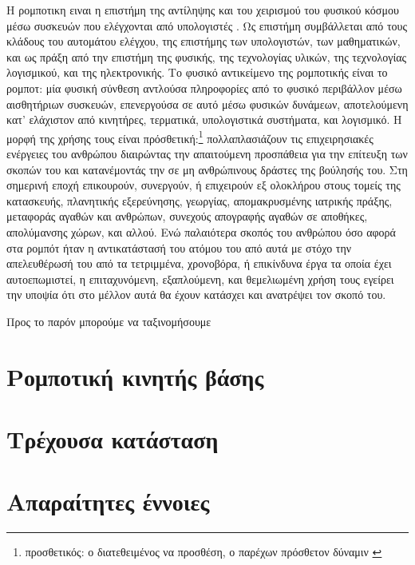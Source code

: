 Η ρομποτικη ειναι η επιστήμη της αντίληψης και του χειρισμού του φυσικού κόσμου
μέσω συσκευών που ελέγχονται από υπολογιστές \cite{thrun2005probabilistic}.  Ως
επιστήμη συμβάλλεται από τους κλάδους του αυτομάτου ελέγχου, της επιστήμης των
υπολογιστών, των μαθηματικών, και ως πράξη από την επιστήμη της φυσικής, της
τεχνολογίας υλικών, της τεχνολογίας λογισμικού, και της ηλεκτρονικής. Το φυσικό
αντικείμενο της ρομποτικής είναι το ρομποτ: μία φυσική σύνθεση αντλούσα
πληροφορίες από το φυσικό περιβάλλον μέσω αισθητήριων συσκευών, επενεργούσα σε
αυτό μέσω φυσικών δυνάμεων, αποτελούμενη κατ' ελάχιστον από κινητήρες,
τερματικά, υπολογιστικά συστήματα, και λογισμικό. Η μορφή της χρήσης τους είναι
πρόσθετική:\footnote{προσθετικός: ο διατεθειμένος να προσθέση, ο παρέχων
πρόσθετον δύναμιν \cite{liddell_scott}} πολλαπλασιάζουν τις επιχειρησιακές
ενέργειες του ανθρώπου διαιρώντας την απαιτούμενη προσπάθεια για την επίτευξη
των σκοπών του και κατανέμοντάς την σε μη ανθρώπινους δράστες της βούλησής του.
Στη σημερινή εποχή επικουρούν, συνεργούν, ή επιχειρούν εξ ολοκλήρου στους
τομείς της κατασκευής, πλανητικής εξερεύνησης, γεωργίας, απομακρυσμένης
ιατρικής πράξης, μεταφοράς αγαθών και ανθρώπων, συνεχούς απογραφής αγαθών σε
αποθήκες, απολύμανσης χώρων, και αλλού. Ενώ παλαιότερα σκοπός του ανθρώπου όσο
αφορά στα ρομπότ ήταν η αντικατάστασή του ατόμου του από αυτά με στόχο την
απελευθέρωσή του από τα τετριμμένα, χρονοβόρα, ή επικίνδυνα έργα τα οποία έχει
αυτοεπωμιστεί, η επιταχυνόμενη, εξαπλούμενη, και θεμελιωμένη χρήση τους εγείρει
την υποψία ότι στο μέλλον αυτά θα έχουν κατάσχει και ανατρέψει τον σκοπό του.

Προς το παρόν μπορούμε να ταξινομήσουμε





\section{Ρομποτική κινητής βάσης}


\section{Τρέχουσα κατάσταση}


\section{Απαραίτητες έννοιες} 
